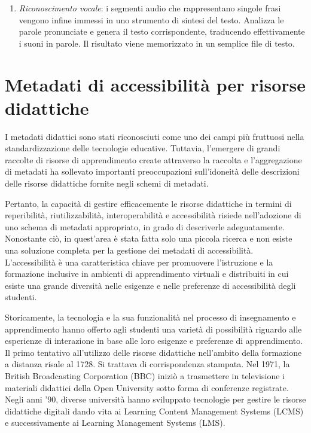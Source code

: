 \begin{enumerate}
\item \textit{Riconoscimento vocale}: i segmenti audio che rappresentano singole frasi vengono infine immessi in uno strumento di sintesi del testo. Analizza le parole pronunciate e genera il testo corrispondente, traducendo effettivamente i suoni in parole. Il risultato viene memorizzato in un semplice file di testo.
\end{enumerate}

\section{Metadati di accessibilità per risorse didattiche}
I metadati didattici sono stati riconosciuti come uno dei campi più fruttuosi nella standardizzazione delle tecnologie educative. Tuttavia, l'emergere di grandi raccolte di risorse di apprendimento create attraverso la raccolta e l'aggregazione di metadati ha sollevato importanti preoccupazioni sull'idoneità delle descrizioni delle risorse didattiche fornite negli schemi di metadati.

Pertanto, la capacità di gestire efficacemente le risorse didattiche in termini di reperibilità, riutilizzabilità, interoperabilità e accessibilità risiede nell'adozione di uno schema di metadati appropriato, in grado di descriverle adeguatamente. Nonostante ciò, in quest'area è stata fatta solo una piccola ricerca e non esiste una soluzione completa per la gestione dei metadati di accessibilità. L'accessibilità è una caratteristica chiave per promuovere l'istruzione e la formazione inclusive in ambienti di apprendimento virtuali e distribuiti in cui esiste una grande diversità nelle esigenze e nelle preferenze di accessibilità degli studenti.

Storicamente, la tecnologia e la sua funzionalità nel processo di insegnamento e apprendimento hanno offerto agli studenti una varietà di possibilità riguardo alle esperienze di interazione in base alle loro esigenze e preferenze di apprendimento. Il primo tentativo all'utilizzo delle risorse didattiche nell'ambito della formazione a distanza risale al 1728. Si trattava di corrispondenza stampata. Nel 1971, la British Broadcasting Corporation (BBC) iniziò a trasmettere in televisione i materiali didattici della Open University sotto forma di conferenze registrate. Negli anni '90, diverse università hanno sviluppato tecnologie per gestire le risorse didattiche digitali dando vita ai Learning Content Management Systems (LCMS) e successivamente ai Learning Management Systems (LMS).

